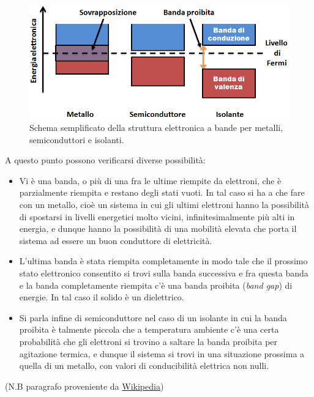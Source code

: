 \documentclass[
]{book}
\providecommand{\tightlist}{%
  \setlength{\itemsep}{0pt}\setlength{\parskip}{0pt}}
\begin{document}
\begin{figure}
\centering
\includegraphics[width=0.5\linewidth,height=\textheight,keepaspectratio]{immagini/bande.png}
\caption{Schema semplificato della struttura elettronica a bande per
metalli, semiconduttori e isolanti.}
\end{figure}

A questo punto possono verificarsi diverse possibilità:

\begin{itemize}
\tightlist
\item
  Vi è una banda, o più di una fra le ultime riempite da elettroni, che
  è parzialmente riempita e restano degli stati vuoti. In tal caso si ha
  a che fare con un metallo, cioè un sistema in cui gli ultimi elettroni
  hanno la possibilità di spostarsi in livelli energetici molto vicini,
  infinitesimalmente più alti in energia, e dunque hanno la possibilità
  di una mobilità elevata che porta il sistema ad essere un buon
  conduttore di elettricità.
\item
  L'ultima banda è stata riempita completamente in modo tale che il
  prossimo stato elettronico consentito si trovi sulla banda successiva
  e fra questa banda e la banda completamente riempita c'è una banda
  proibita (\emph{band gap}) di energie. In tal caso il solido è un
  dielettrico.
\item
  Si parla infine di semiconduttore nel caso di un isolante in cui la
  banda proibita è talmente piccola che a temperatura ambiente c'è una
  certa probabilità che gli elettroni si trovino a saltare la banda
  proibita per agitazione termica, e dunque il sistema si trovi in una
  situazione prossima a quella di un metallo, con valori di
  conducibilità elettrica non nulli.
\end{itemize}

(N.B paragrafo proveniente da
\href{https://it.wikipedia.org/wiki/Struttura_elettronica_a_bande}{Wikipedia})

\end{document}
